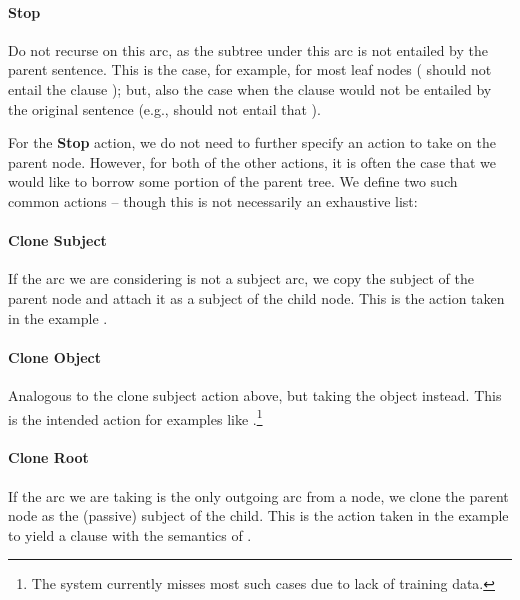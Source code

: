 \paragraph{Stop} 
  Do not recurse on this arc, as the subtree under this arc is
    not entailed by the parent sentence.
  This is the case, for example, for most leaf nodes
    ( should not entail the clause );
    but, also the case when the clause would not be entailed by the original
    sentence (e.g., 
    should not entail that ).

For the \textbf{Stop} action, we do not need to further specify an action
  to take on the parent node.
However, for both of the other actions, it is often the case that we would like
  to borrow some portion of the parent tree.
We define two such common actions -- though this is not necessarily an
  exhaustive list:

\paragraph{Clone Subject} 
  If the arc we are considering is not a subject arc,
    we copy the subject of the parent node and attach it as a subject of the
    child node.
  This is the action taken in the example
    .

\paragraph{Clone Object} 
  Analogous to the clone subject action above, but taking the object
    instead.
  This is the intended action for examples like
    .\footnote{
      The system currently misses most such cases due to lack of training
      data.
    }

\paragraph{Clone Root} 
  If the arc we are taking is the only outgoing arc from a node, we clone the
    parent node as the (passive) subject of the child.
  This is the action taken in the example
     to yield a clause with the
    semantics of .

